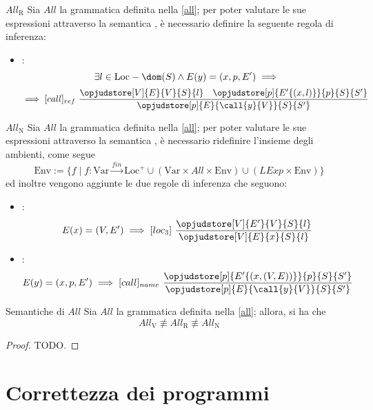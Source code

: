 \documentclass[a4paper, 12pt]{report}
\begin{document}
    \begin{framedprop}[label={all r}]{$All_\mathrm{R}$}
        Sia $All$ la grammatica definita nella \cref{all}; per poter valutare le sue espressioni attraverso la semantica , è necessario definire la seguente regola di inferenza: 

        \begin{itemize}
            \item {}: $$\exists l \in \mathrm{Loc} - \dom(S) \land E(y) = (x, p, E') \implies$$ $$\implies [call]_{ref} \ \dfrac{\opjudstore[V]{E}{V}{S}{l} \quad \opjudstore[p]{E'\{(x,l)\}}{p}{S}{S'}}{\opjudstore[p]{E}{\call{y}{V}}{S}{S'}}$$
        \end{itemize}
    \end{framedprop}

    \begin{framedprop}[label={all n}]{$All_\mathrm{N}$}
        Sia $All$ la grammatica definita nella \cref{all}; per poter valutare le sue espressioni attraverso la semantica , è necessario ridefinire l'insieme degli ambienti, come segue $$\mathrm{Env} := \{f \mid f : \mathrm{Var} \xrightarrow{fin} \mathrm{Loc}^+ \cup (\mathrm{Var} \times All \times \mathrm{Env}) \cup (LExp \times \mathrm{Env})\}$$ ed inoltre vengono aggiunte le due regole di inferenza che seguono:

        \begin{itemize}
            \item {}: $$E(x) = (V, E') \implies [loc_3] \ \dfrac{\opjudstore[V]{E'}{V}{S}{l}}{\opjudstore[V]{E}{x}{S}{l}}$$
            \item {}: $$E(y) = (x, p, E') \implies [call]_{name} \ \dfrac{\opjudstore[p]{E'\{(x,(V,E))\}}{p}{S}{S'}}{\opjudstore[p]{E}{\call{y}{V}}{S}{S'}}$$
        \end{itemize}
    \end{framedprop}

    \begin{framedlem}{Semantiche di $All$}
        Sia $All$ la grammatica definita nella \cref{all}; allora, si ha che $$All_\mathrm{V} \not\equiv All_\mathrm{R} \not\equiv All_\mathrm{N}$$
    \end{framedlem}
    
    \begin{proof}
        TODO.
    \end{proof}

    \chapter{Correttezza dei programmi}
    
\end{document}
